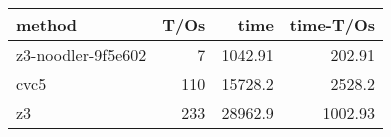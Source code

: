 \begin{tabular}{lrrr}
\hline
 method             &   T/Os &     time &   time-T/Os \\
\hline
 z3-noodler-9f5e602 &      7 &  1042.91 &      202.91 \\
 cvc5               &    110 & 15728.2  &     2528.2  \\
 z3                 &    233 & 28962.9  &     1002.93 \\
\hline
\end{tabular}
